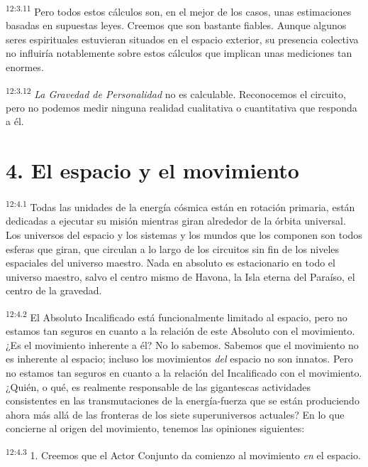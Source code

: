 \par
\textsuperscript{12:3.11} Pero todos estos cálculos son, en el mejor de los casos, unas estimaciones basadas en supuestas leyes. Creemos que son bastante fiables. Aunque algunos seres espirituales estuvieran situados en el espacio exterior, su presencia colectiva no influiría notablemente sobre estos cálculos que implican unas mediciones tan enormes.

\par
\textsuperscript{12:3.12} \textit{La Gravedad de Personalidad} no es calculable. Reconocemos el circuito, pero no podemos medir ninguna realidad cualitativa o cuantitativa que responda a él.

\section*{4. El espacio y el movimiento}
\par
\textsuperscript{12:4.1} Todas las unidades de la energía cósmica están en rotación primaria, están dedicadas a ejecutar su misión mientras giran alrededor de la órbita universal. Los universos del espacio y los sistemas y los mundos que los componen son todos esferas que giran, que circulan a lo largo de los circuitos sin fin de los niveles espaciales del universo maestro. Nada en absoluto es estacionario en todo el universo maestro, salvo el centro mismo de Havona, la Isla eterna del Paraíso, el centro de la gravedad.

\par
\textsuperscript{12:4.2} El Absoluto Incalificado está funcionalmente limitado al espacio, pero no estamos tan seguros en cuanto a la relación de este Absoluto con el movimiento. ¿Es el movimiento inherente a él? No lo sabemos. Sabemos que el movimiento no es inherente al espacio; incluso los movimientos \textit{del} espacio no son innatos. Pero no estamos tan seguros en cuanto a la relación del Incalificado con el movimiento. ¿Quién, o qué, es realmente responsable de las gigantescas actividades consistentes en las transmutaciones de la energía-fuerza que se están produciendo ahora más allá de las fronteras de los siete superuniversos actuales? En lo que concierne al origen del movimiento, tenemos las opiniones siguientes:

\par
\textsuperscript{12:4.3} 1. Creemos que el Actor Conjunto da comienzo al movimiento \textit{en} el espacio.

